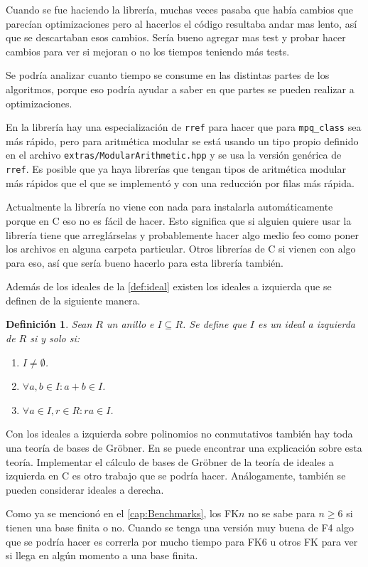\documentclass[12pt]{report}
\theoremstyle{customstyle}
\newtheorem{definition}[theorem]{Definición}
\theoremstyle{factstyle}
\newcommand\cpp{C\nolinebreak[4]\hspace{-.05em}\raisebox{.4ex}{\relsize{-3}{\textbf{++}}}\xspace}
\begin{document}
Cuando se fue haciendo la librería, muchas veces pasaba que había cambios que parecían optimizaciones pero al hacerlos el código resultaba andar mas lento, así que se descartaban esos cambios. Sería bueno agregar mas test y probar hacer cambios para ver si mejoran o no los tiempos teniendo más tests.

Se podría analizar cuanto tiempo se consume en las distintas partes de los algoritmos, porque eso podría ayudar a saber en que partes se pueden realizar a optimizaciones.

En la librería hay una especialización de \texttt{rref} para hacer que para \texttt{mpq\_class} sea más rápido, pero para aritmética modular se está usando un tipo propio definido en el archivo \texttt{extras/ModularArithmetic.hpp} y se usa la versión genérica de \texttt{rref}. Es posible que ya haya librerías que tengan tipos de aritmética modular más rápidos que el que se implementó y con una reducción por filas más rápida.

Actualmente la librería no viene con nada para instalarla automáticamente porque en \cpp eso no es fácil de hacer. Esto significa que si alguien quiere usar la librería tiene que arreglárselas y probablemente hacer algo medio feo como poner los archivos en alguna carpeta particular. Otros librerías de \cpp si vienen con algo para eso, así que sería bueno hacerlo para esta librería también.

Además de los ideales de la \cref{def:ideal} existen los ideales a izquierda que se definen de la siguiente manera.
\begin{definition}
  Sean $R$ un anillo e $I ⊆ R$. Se define que $I$ es un ideal a izquierda de $R$ si y solo si:
  \begin{enumerate}
    \item $I ≠ ∅$.
    \item $∀a, b ∈ I : a + b ∈ I$.
    \item $∀a ∈ I, r ∈ R : r a ∈ I$.
  \end{enumerate}
\end{definition}
\noindent Con los ideales a izquierda sobre polinomios no conmutativos también hay toda una teoría de bases de Gröbner. En \cite{phdthesis:Hof23} se puede encontrar una explicación sobre esta teoría. Implementar el cálculo de bases de Gröbner de la teoría de ideales a izquierda en \cpp es otro trabajo que se podría hacer. Análogamente, también se pueden considerar ideales a derecha.

Como ya se mencionó en el \cref{cap:Benchmarks}, los FK$n$ no se sabe para $n ≥ 6$ si tienen una base finita o no. Cuando se tenga una versión muy buena de F4 algo que se podría hacer es correrla por mucho tiempo para FK6 u otros FK para ver si llega en algún momento a una base finita.
\end{document}
